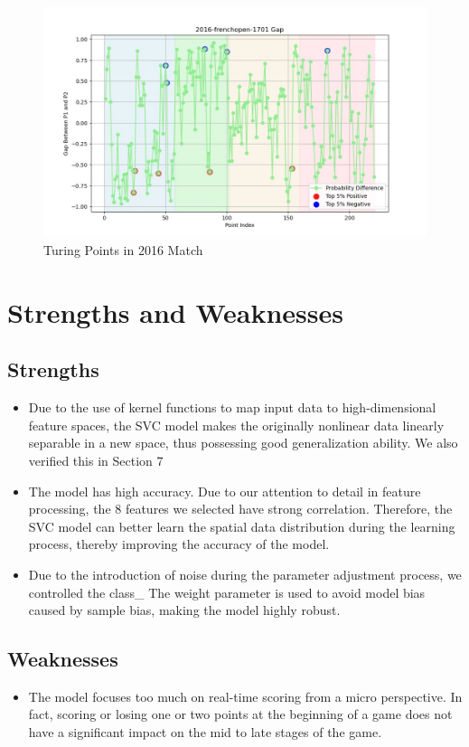 \documentclass{mcmthesis}
\begin{document}
\begin{figure}[h]
\centering
\includegraphics[width=12cm]{figures/D2016.png}
\caption{Turing Points in 2016 Match} \label{fig:aa}
\end{figure}




\section{Strengths and Weaknesses}
\subsection{Strengths}
\begin{itemize}
  \item Due to the use of kernel functions to map input data to high-dimensional feature spaces, the SVC model makes the originally nonlinear data linearly separable in a new space, thus possessing good generalization ability. We also verified this in Section 7
  \item The model has high accuracy. Due to our attention to detail in feature processing, the 8 features we selected have strong correlation. Therefore, the SVC model can better learn the spatial data distribution during the learning process, thereby improving the accuracy of the model.
  \item Due to the introduction of noise during the parameter adjustment process, we controlled the class\_ The weight parameter is used to avoid model bias caused by sample bias, making the model highly robust.
\end{itemize}

\subsection{Weaknesses}
\begin{itemize}
    \item The model focuses too much on real-time scoring from a micro perspective. In fact, scoring or losing one or two points at the beginning of a game does not have a significant impact on the mid to late stages of the game.
\end{itemize}
\end{document}
